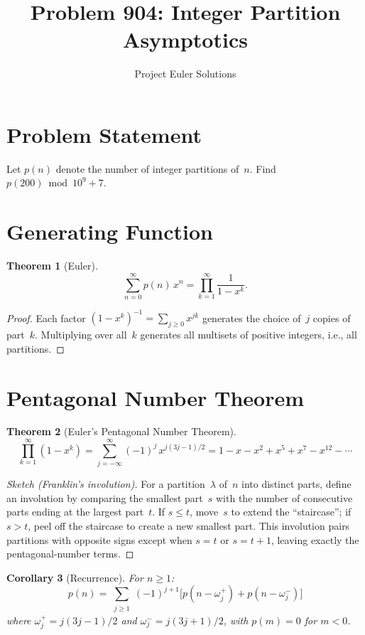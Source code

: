 \documentclass[11pt]{article}
\title{Problem 904: Integer Partition Asymptotics}
\author{Project Euler Solutions}
\date{}
\newtheorem{theorem}{Theorem}
\newtheorem{corollary}[theorem]{Corollary}
\begin{document}
\maketitle

\section{Problem Statement}

Let $p(n)$ denote the number of integer partitions of~$n$. Find $p(200) \bmod 10^9+7$.

\section{Generating Function}

\begin{theorem}[Euler]
\[
\sum_{n=0}^{\infty} p(n)\,x^n = \prod_{k=1}^{\infty} \frac{1}{1-x^k}.
\]
\end{theorem}

\begin{proof}
Each factor $(1-x^k)^{-1} = \sum_{j \ge 0} x^{jk}$ generates the choice of~$j$ copies of part~$k$. Multiplying over all~$k$ generates all multisets of positive integers, i.e., all partitions.
\end{proof}

\section{Pentagonal Number Theorem}

\begin{theorem}[Euler's Pentagonal Number Theorem]
\[
\prod_{k=1}^{\infty}(1-x^k) = \sum_{j=-\infty}^{\infty} (-1)^j\, x^{j(3j-1)/2} = 1 - x - x^2 + x^5 + x^7 - x^{12} - \cdots
\]
\end{theorem}

\begin{proof}[Sketch (Franklin's involution)]
For a partition~$\lambda$ of~$n$ into distinct parts, define an involution by comparing the smallest part~$s$ with the number of consecutive parts ending at the largest part~$t$. If $s \le t$, move~$s$ to extend the ``staircase''; if $s > t$, peel off the staircase to create a new smallest part. This involution pairs partitions with opposite signs except when $s = t$ or $s = t+1$, leaving exactly the pentagonal-number terms.
\end{proof}

\begin{corollary}[Recurrence]
\label{cor:recurrence}
For $n \ge 1$:
\[
p(n) = \sum_{\substack{j \ge 1}} (-1)^{j+1}\bigl[p(n - \omega_j^+) + p(n - \omega_j^-)\bigr]
\]
where $\omega_j^+ = j(3j-1)/2$ and $\omega_j^- = j(3j+1)/2$, with $p(m) = 0$ for $m < 0$.
\end{corollary}
\end{document}
